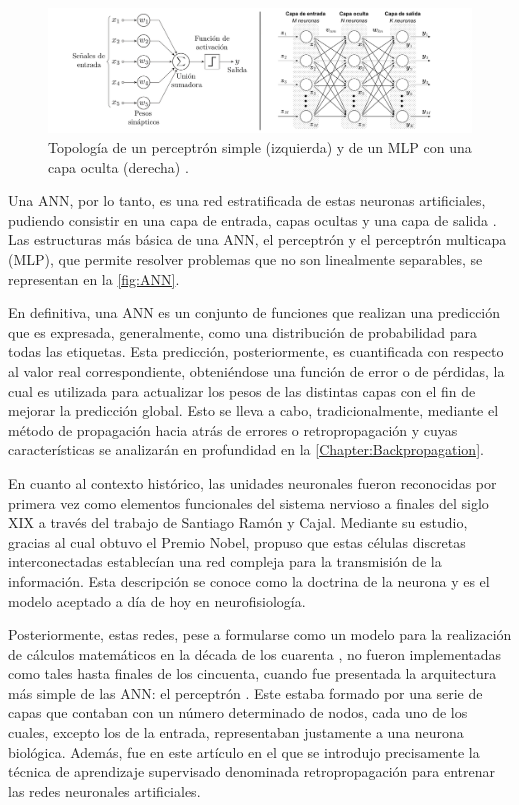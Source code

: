 \begin{figure}
    \centering
    \includegraphics[width=\textwidth]{Images/perceptron_MLP.png}
    \caption{Topología de un perceptrón simple (izquierda) \cite{img:perceptron} y de un MLP con una capa oculta (derecha) \cite{img:MLP}.}
    \label{fig:ANN}
\end{figure}

Una ANN, por lo tanto, es una red estratificada de estas neuronas artificiales, pudiendo consistir en una capa de entrada, capas ocultas y una capa de salida \cite{Engelbrecht}. Las estructuras más básica de una ANN, el perceptrón y el perceptrón multicapa (MLP), que permite resolver problemas que no son linealmente separables, se representan en la \autoref{fig:ANN}.

En definitiva, una ANN es un conjunto de funciones que realizan una predicción que es expresada, generalmente, como una distribución de probabilidad para todas las etiquetas. Esta predicción, posteriormente, es cuantificada con respecto al valor real correspondiente, obteniéndose una función de error o de pérdidas, la cual es utilizada para actualizar los pesos de las distintas capas con el fin de mejorar la predicción global. Esto se lleva a cabo, tradicionalmente, mediante el método de propagación hacia atrás de errores o retropropagación y cuyas características se analizarán en profundidad en la \autoref{Chapter:Backpropagation}.

En cuanto al contexto histórico, las unidades neuronales fueron reconocidas por primera vez como elementos funcionales del sistema nervioso a finales del siglo XIX a través del trabajo de Santiago Ramón y Cajal. Mediante su estudio, gracias al cual obtuvo el Premio Nobel, propuso que estas células discretas interconectadas establecían una red compleja para la transmisión de la información. Esta descripción se conoce como la doctrina de la neurona y es el modelo aceptado a día de hoy en neurofisiología.

Posteriormente, estas redes, pese a formularse como un modelo para la realización de cálculos matemáticos en la década de los cuarenta \cite{McCulloch}, no fueron implementadas como tales hasta finales de los cincuenta, cuando fue presentada la arquitectura más simple de las ANN: el perceptrón \cite{Rosenblatt}. Este estaba formado por una serie de capas que contaban con un número determinado de nodos, cada uno de los cuales, excepto los de la entrada, representaban justamente a una neurona biológica. Además, fue en este artículo  en el que se introdujo precisamente la técnica de aprendizaje supervisado denominada retropropagación para entrenar las redes neuronales artificiales. 

